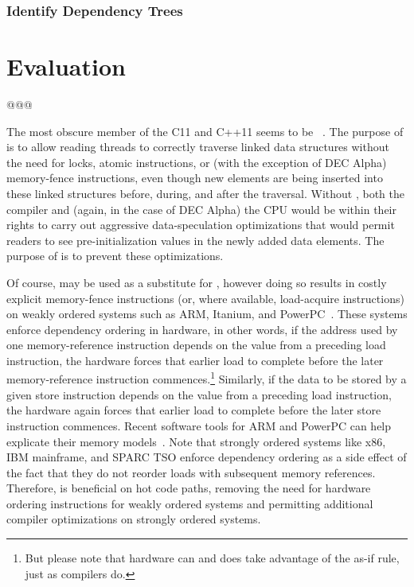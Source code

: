 \documentclass[letterpaper,twocolumn,10pt]{article}
\begin{document}
\subsubsection{Identify Dependency Trees}
\label{sec:Identify Dependency Trees}

\section{Evaluation}
\label{sec:Evaluation}

@@@

The most obscure member of the C11 and C++11  
seems to be
~\cite{RichardSmith2015N4527}.
The purpose of  is to allow reading threads
to correctly traverse linked data structures without the need for locks,
atomic instructions, or (with the exception of DEC Alpha) memory-fence
instructions, even though new elements are being inserted into these
linked structures before, during, and after the traversal.
Without , both the compiler and (again, in the case
of DEC Alpha) the CPU would be within their rights to carry out aggressive
data-speculation optimizations that would permit readers to see
pre-initialization values in the newly added data elements.
The purpose of  is to prevent these optimizations.

Of course,  may be used as a substitute for
, however doing so results in costly
explicit memory-fence instructions (or, where available, load-acquire
instructions) on weakly ordered systems such as ARM, Itanium, and
PowerPC~\cite{ARMv7A:2010,ARMv8Litmus2009,IntelItaniumMemoryOrdering2002,PowerISA2.07-2013}.
These systems enforce dependency ordering in hardware, in other words,
if the address used by one memory-reference instruction depends on the
value from a preceding load instruction, the hardware forces that
earlier load to complete before the later memory-reference instruction
commences.\footnote{
	But please note that hardware can and does take advantage
	of the as-if rule, just as compilers do.}
Similarly, if the data to be stored by a given store instruction depends
on the value from a preceding load instruction, the hardware again
forces that earlier load to complete before the later store instruction
commences.
Recent software tools for ARM and PowerPC can help explicate their
memory models~\cite{JadeAlglave2011ppcmem,Alglave:2014:HCM:2594291.2594347,PaulEMcKenney2011ppcmem,PaulEMcKenney2014weakaxiom}.
Note that strongly ordered systems like x86, IBM mainframe, and
SPARC TSO enforce dependency ordering as a side effect of the
fact that they do not reorder loads with subsequent memory references.
Therefore,  is beneficial on hot code paths,
removing the need for hardware ordering instructions for weakly ordered
systems and permitting additional compiler optimizations on
strongly ordered systems.
\end{document}
